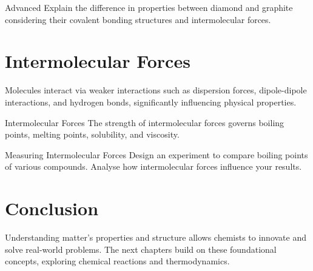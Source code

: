 \begin{tieredquestions}{Advanced}
Explain the difference in properties between diamond and graphite considering their covalent bonding structures and intermolecular forces.
\end{tieredquestions}

\FloatBarrier

\section{Intermolecular Forces}
\FloatBarrier
\FloatBarrier
\FloatBarrier

Molecules interact via weaker interactions such as dispersion forces, dipole-dipole interactions, and hydrogen bonds, significantly influencing physical properties.

\begin{keyconcept}{Intermolecular Forces}
The strength of intermolecular forces governs boiling points, melting points, solubility, and viscosity.
\end{keyconcept}

\begin{investigation}{Measuring Intermolecular Forces}
Design an experiment to compare boiling points of various compounds. Analyse how intermolecular forces influence your results.
\end{investigation}

\FloatBarrier

\section{Conclusion}
\FloatBarrier
\FloatBarrier
\FloatBarrier

Understanding matter's properties and structure allows chemists to innovate and solve real-world problems. The next chapters build on these foundational concepts, exploring chemical reactions and thermodynamics.

\newpage